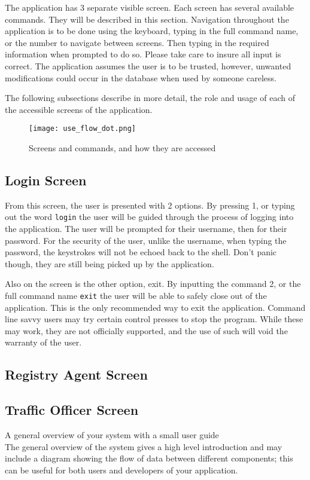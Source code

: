 The application has 3 separate visible screen. Each screen has several
available commands. They will be described in this section. Navigation
throughout the application is to be done using the keyboard, typing in the full
command name, or the number to navigate between screens. Then typing in the
required information when prompted to do so. Please take care to insure all
input is correct. The application assumes the user is to be trusted, however,
unwanted modifications could occur in the database when used by someone
careless.

The following subsections describe in more detail, the role and usage of each
of the accessible screens of the application.

\begin{figure}[h!]
    \centering
    \texttt{[image: use\_flow\_dot.png]}
    \caption{Screens and commands, and how they are accessed}
\end{figure}

\subsection{Login Screen}

From this screen, the user is presented with 2 options. By pressing 1, or
typing out the word \verb|login| the user will be guided through the process of
logging into the application. The user will be prompted for their username,
then for their password. For the security of the user, unlike the username,
when typing the password, the keystrokes will not be echoed back to the shell.
Don't panic though, they are still being picked up by the application.

Also on the screen is the other option, exit. By inputting the command 2, or
the full command name \verb|exit| the user will be able to safely close out of
the application. This is the only recommended way to exit the application.
Command line savvy users may try certain control presses to stop the program.
While these may work, they are not officially supported, and the use of such
will void the warranty of the user.

\subsection{Registry Agent Screen}
\subsection{Traffic Officer Screen}

A general overview of your system with a small user guide\\
The general overview of the system gives a high level introduction and may include a diagram showing the flow of data between different components; this can be useful for both users and developers of your application.

